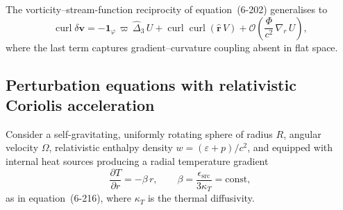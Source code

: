 The vorticity--stream-function reciprocity of equation~(6-202)
generalises to
\begin{equation}\label{eq:rel-6-204}
  \operatorname{curl}\delta\boldsymbol{v}
  = -\mathbf{1}_{\varphi}\,\varpi\,\hat{\Delta}_{3}\,U
    + \operatorname{curl}\operatorname{curl}
      (\hat{\boldsymbol{r}}\,V)
    + \mathcal{O}\!\left(\frac{\Phi}{c^{2}}\,
      \nabla_{\!r}\,U\right),
\end{equation}
where the last term captures gradient--curvature coupling absent in
flat space.

\subsection{Perturbation equations with relativistic
  Coriolis acceleration}\label{sec:rel-61b}

Consider a self-gravitating, uniformly rotating sphere of radius $R$,
angular velocity $\Omega$, relativistic enthalpy density
$w = (\varepsilon + p)/c^{2}$, and equipped with internal heat
sources producing a radial temperature gradient
\begin{equation}\label{eq:rel-6-216}
  \frac{\partial T}{\partial r} = -\beta\,r,
  \qquad
  \beta = \frac{\epsilon_{\mathrm{src}}}{3\kappa_{T}}
  = \text{const},
\end{equation}
as in equation~(6-216), where $\kappa_{T}$ is the thermal
diffusivity.

